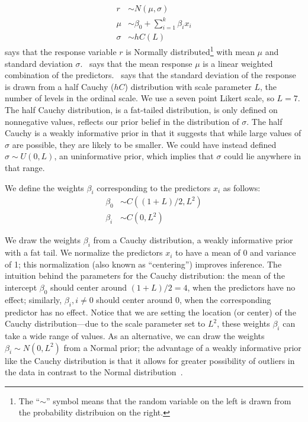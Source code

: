 \begin{align}
 r      & \sim N(\mu, \sigma)                    \label{eq:response-main}                   \\
 \mu    & \sim \beta_0 + \sum_{i=1}^k \beta_i x_i                        \label{eq:mu-main} \\
 \sigma & \sim hC(L) \label{eq:main-sigma}
\end{align}
 says that the response variable $r$ is Normally distributed\footnote{The ``$\sim$'' symbol means that the random variable on the left is drawn from the probability distribuion on the right.} with mean $\mu$ and standard deviation $\sigma$.~ says that the mean response $\mu$ is a linear weighted combination of the predictors.~ says that the standard deviation of the response is drawn from a half Cauchy ($hC$) distribution with scale parameter $L$, the number of levels in the ordinal scale. We use a seven point Likert scale, so $L=7.$ The half Cauchy distribution, is a fat-tailed distribution, is only defined on nonnegative values, reflects our prior belief in the distribution of $\sigma$. The half Cauchy is a weakly informative prior in that it suggests that while large values of $\sigma$ are possible, they are likely to be smaller. We could have instead defined $\sigma \sim U(0, L)$, an uninformative prior, which implies that $\sigma$ could lie anywhere in that range.

We define the weights $\beta_i$ corresponding to the predictors $x_i$ as follows:
\begin{align}
 \beta_0 & \sim C((1+L)/2, L^2) \\
 \beta_i & \sim  C(0, L^2)
\end{align}

We draw the weights $\beta_i$ from a Cauchy distribution, a weakly informative prior with a fat tail. We normalize the predictors $x_i$ to have a mean of 0 and variance of 1; this normalization (also known as ``centering'') improves inference. The intuition behind the parameters for the Cauchy distribution: the mean of the intercept $\beta_0$ should center around $(1+L)/2=4$, when the predictors have no effect; similarly, $\beta_i, i\neq 0$ should center around 0, when the corresponding predictor has no effect. Notice that we are setting the location (or center) of the Cauchy distribution---due to the scale parameter set to $L^2$, these weights $\beta_i$ can take a wide range of values. As an alternative, we can draw the weights $\beta_i \sim N(0, L^2)$ from a Normal prior; the advantage of a weakly informative prior like the Cauchy distribution is that it allows for greater possibility of outliers in the data in contrast to the Normal distribution~\cite{Kay2016}.


